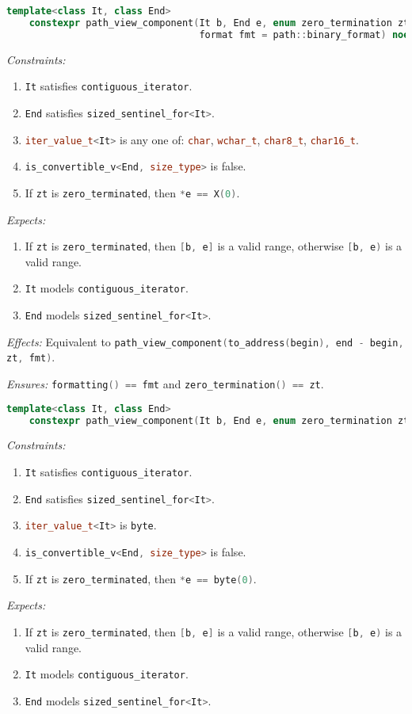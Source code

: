 \documentclass[11pt]{article}
\newcommand{\code}[2][cpp]{\lstinline[language=#1,basicstyle=\small\ttfamily]{#2}}
\newcommand{\desc}[1]{\textit{#1}}
\newcommand{\constraints}{\desc{Constraints: }}
\newcommand{\effects}{\desc{Effects: }}
\newcommand{\expects}{\desc{Expects: }}
\newcommand{\ensures}{\desc{Ensures: }}
\begin{document}
\begin{lstlisting}[language=cpp]
    template<class It, class End>
    constexpr path_view_component(It b, End e, enum zero_termination zt,
                                  format fmt = path::binary_format) noexcept;
\end{lstlisting}
\constraints \begin{enumerate}
    \item \code{It} satisfies \code{contiguous_iterator}.
    \item \code{End} satisfies \code{sized_sentinel_for<It>}.
    \item \code{iter_value_t<It>} is any one of: \code{char}, \code{wchar_t}, \code{char8_t}, \code{char16_t}.
    \item \code{is_convertible_v<End, size_type>} is false.
    \item If \code{zt} is \code{zero_terminated}, then \code{*e == X(0)}.
\end{enumerate}
\expects \begin{enumerate}
    \item If \code{zt} is \code{zero_terminated}, then \code{[b, e]} is a valid range, otherwise \code{[b, e)} is a valid range.
    \item \code{It} models \code{contiguous_iterator}.
    \item \code{End} models \code{sized_sentinel_for<It>}.
\end{enumerate}

\effects Equivalent to \code{path_view_component(to_address(begin), end - begin, zt, fmt)}.

\ensures \code{formatting() == fmt} and \code{zero_termination() == zt}.\\

\begin{lstlisting}[language=cpp]
    template<class It, class End>
    constexpr path_view_component(It b, End e, enum zero_termination zt) noexcept;
\end{lstlisting}
\constraints \begin{enumerate}
    \item \code{It} satisfies \code{contiguous_iterator}.
    \item \code{End} satisfies \code{sized_sentinel_for<It>}.
    \item \code{iter_value_t<It>} is \code{byte}.
    \item \code{is_convertible_v<End, size_type>} is false.
    \item If \code{zt} is \code{zero_terminated}, then \code{*e == byte(0)}.
\end{enumerate}
\expects \begin{enumerate}
    \item If \code{zt} is \code{zero_terminated}, then \code{[b, e]} is a valid range, otherwise \code{[b, e)} is a valid range.
    \item \code{It} models \code{contiguous_iterator}.
    \item \code{End} models \code{sized_sentinel_for<It>}.
\end{enumerate}
\end{document}
